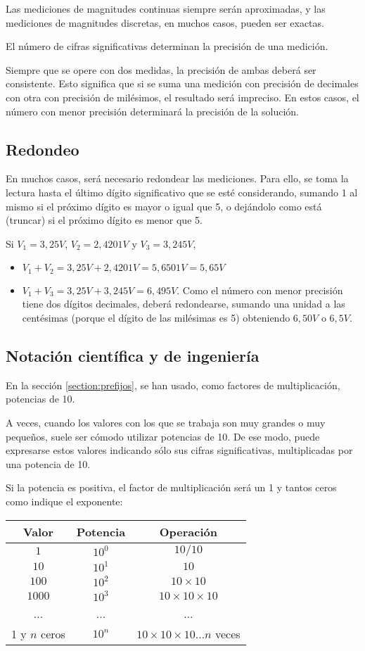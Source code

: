 Las mediciones de magnitudes continuas siempre serán aproximadas, y las mediciones de magnitudes discretas, en muchos casos, pueden ser exactas.

El número de cifras significativas determinan la precisión de una medición.

Siempre que se opere con dos medidas, la precisión de ambas deberá ser consistente. Esto significa que si se suma una medición con precisión de decimales con otra con precisión de milésimos, el resultado será impreciso. En estos casos, el número con menor precisión determinará la precisión de la solución.
\subsection{Redondeo}
En muchos casos, será necesario redondear las mediciones. Para ello, se toma la lectura hasta el último dígito significativo que se esté considerando, sumando 1 al mismo si el próximo dígito es mayor o igual que 5, o dejándolo como está (truncar) si el próximo dígito es menor que 5.

\begin{ejemplo}
Si $V_1=3,25 V$, $V_2=2,4201 V$ y $V_3=3,245V$, 
	\begin{itemize}
		\item $V_1+V_2=3,25 V + 2,4201 V=5,6501 V=5,65 V$
		\item $V_1+V_3=3,25 V + 3,245 V = 6,495 V $. Como el número con menor precisión tiene dos dígitos decimales, deberá redondearse, sumando una unidad a las centésimas (porque el dígito de las milésimas es 5) obteniendo $6,50 V$ o $6,5V$.
	\end{itemize}
\end{ejemplo}
\subsection{Notación científica y de ingeniería}
En la sección \ref{section:prefijos}, se han usado, como factores de multiplicación, potencias de 10.

A veces, cuando los valores con los que se trabaja son muy grandes o muy pequeños, suele ser cómodo utilizar potencias de 10. De ese modo, puede expresarse estos valores indicando sólo sus cifras significativas, multiplicadas por una potencia de 10.

Si la potencia es positiva, el factor de multiplicación será un 1 y tantos ceros como indique el exponente:

\begin{tabular}{|c|c|c|}
\hline 
Valor & Potencia & Operación \\ 
\hline 
$1$ & $10^0$ & $10/10$ \\ 
\hline 
$10$ & $10^1$ & $10$ \\ 
\hline 
$100$ & $10^2$ & $10 \times 10$ \\ 
\hline 
$1000$ & $10^3$ & $10 \times 10 \times 10$ \\ 
\hline 
... & ... & ... \\ 
\hline 
1 y $n$ ceros & $10^n$ & $10 \times 10 \times 10 ... n$ veces \\ 
\hline 
\end{tabular} 

